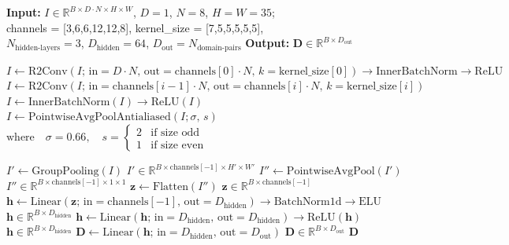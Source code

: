 \begin{algorithm}[H]
\caption{\textsc{Forward function of the $(\R^2, +) \rtimes C_8$-equivariant CNN}}
\label{alg:cnscnn}
\begin{algorithmic}
\State \textbf{Input:} $I \in \mathbb{R}^{B \times D \cdot N \times H \times W}$, $D=1$, $N=8$, $H=W=35$; \\
channels = [3,6,6,12,12,8], kernel\_size = [7,5,5,5,5,5], \\
$N_{\text{hidden-layers}} = 3$, $D_{\text{hidden}} = 64$, $D_{\text{out}} = N_{\text{domain-pairs}}$
\State \textbf{Output:} $\mathbf{D} \in \mathbb{R}^{B \times D_{\text{out}}}$

\State $I \gets \mathrm{R2Conv}(I;\, \text{in}=D \cdot N,\, \text{out}=\mathrm{channels}[0] \cdot N,\, k=\mathrm{kernel\_size}[0]) \to \mathrm{InnerBatchNorm} \to \mathrm{ReLU}$
    \State $I \gets \mathrm{R2Conv}(I;\, \text{in}=\mathrm{channels}[i-1]\!\cdot N,\, \text{out}=\mathrm{channels}[i]\!\cdot N,\, k=\mathrm{kernel\_size}[i])$
    \State $I \gets \mathrm{InnerBatchNorm}(I) \to \mathrm{ReLU}(I)$
        \State $I \gets \mathrm{PointwiseAvgPoolAntialiased}\!\left(I;\sigma,\,s\right)$
        \State $\text{where}\quad
        \sigma=0.66, \quad
        s=
        \begin{cases}
        2 & \text{if size odd}\\
        1 & \text{if size even}
        \end{cases}$
    \EndIf
\EndFor

\State $I' \gets \mathrm{GroupPooling}(I)$ \hfill $I' \in \mathbb{R}^{B \times \mathrm{channels}[-1] \times H' \times W'}$
\State $I'' \gets \mathrm{PointwiseAvgPool}(I')$ \hfill $I'' \in \mathbb{R}^{B \times \mathrm{channels}[-1] \times 1 \times 1}$
\State $\mathbf{z} \gets \mathrm{Flatten}(I'')$ \hfill $\mathbf{z} \in \mathbb{R}^{B \times \mathrm{channels}[-1]}$
\State $\mathbf{h} \gets \mathrm{Linear}(\mathbf{z};\, \text{in}=\mathrm{channels}[-1],\, \text{out}=D_{\text{hidden}}) \to \mathrm{BatchNorm1d} \to \mathrm{ELU}$ \hfill $\mathbf{h} \in \mathbb{R}^{B \times D_{\text{hidden}}}$
    \State $\mathbf{h} \gets \mathrm{Linear}(\mathbf{h};\, \text{in}=D_{\text{hidden}},\, \text{out}=D_{\text{hidden}}) \to \mathrm{ReLU}(\mathbf{h})$ \hfill $\mathbf{h} \in \mathbb{R}^{B \times D_{\text{hidden}}}$
\EndFor
\State $\mathbf{D} \gets \mathrm{Linear}(\mathbf{h};\, \text{in}=D_{\text{hidden}},\, \text{out}=D_{\text{out}})$ \hfill $\mathbf{D} \in \mathbb{R}^{B \times D_{\text{out}}}$
\State \Return $\mathbf{D}$
\end{algorithmic}
\end{algorithm}

